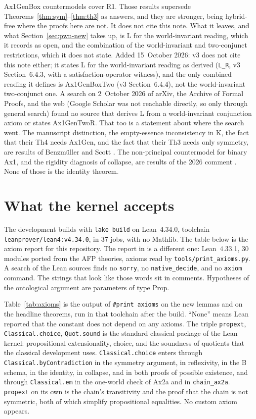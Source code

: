 \documentclass[11pt,a4paper]{article}
\newcommand{\lean}[1]{\texttt{#1}}
\theoremstyle{definition}
\theoremstyle{remark}
\begin{document}
Ax1GenBox countermodels cover R1.
Those results supersede Theorems~\ref{thm:sym}--\ref{thm:th3} as answers,
and they are stronger, being hybrid-free where the proofs here are not.
It does not cite this note.
What it leaves, and what Section~\ref{sec:pwn-new} takes up, is L for the
world-invariant reading, which it records as open, and the combination of
the world-invariant and two-conjunct restrictions, which it does not state.
Added 15~October 2026: v3 does not cite this note either; it states L for the
world-invariant reading as derived (\lean{L\_R}, v3 Section~6.4.3, with a
satisfaction-operator witness), and the only combined reading it defines is
Ax1GenBoxTwo (v3 Section~6.4.4), not the world-invariant two-conjunct
one.
A search on 2~October 2026 of arXiv, the Archive of Formal Proofs, and the
web (Google Scholar was not reachable directly, so only through general
search) found no source that derives L from a world-invariant conjunction
axiom or states Ax1GenTwoR.
That too is a statement about where the search went.
The manuscript distinction, the empty-essence inconsistency in K, the fact
that their Th4 needs Ax1Gen, and the fact that their Th3 needs only symmetry,
are results of Benzm\"uller and Scott \cite{benzmuellerScott2025,afpNotes2025}.
The non-principal countermodel for binary Ax1, and the rigidity diagnosis of
collapse, are results of the 2026 comment \cite{benzmueller2026}.
None of those is the identity theorem.

\section{What the kernel accepts}
\label{sec:kernel}

The development builds with \texttt{lake build} on Lean~4.34.0,
toolchain \texttt{leanprover/lean4:v4.34.0}, in 37 jobs, with no Mathlib.
The table below is the axiom report for this repository.
The report in \cite{benzmuellerLean2026} is a different one: Lean~4.33.1,
30 modules ported from the AFP theories, axioms read by
\lean{tools/print\_axioms.py}.
A search of the Lean sources finds no \lean{sorry}, no \lean{native\_decide},
and no \lean{axiom} command.
The strings that look like those words sit in comments.
Hypotheses of the ontological argument are parameters of type \textsf{Prop}.

Table~\ref{tab:axioms} is the output of \lean{\#print axioms} on the new
lemmas and on the headline theorems, run in that toolchain after the build.
``None'' means Lean reported that the constant does not depend on any axioms.
The triple \lean{propext}, \lean{Classical.choice}, \lean{Quot.sound} is the
standard classical package of the Lean kernel: propositional extensionality,
choice, and the soundness of quotients that the classical development uses.
\lean{Classical.choice} enters through \lean{Classical.byContradiction} in
the symmetry argument, in reflexivity, in the B schema, in the identity, in
collapse, and in both proofs of possible existence, and through
\lean{Classical.em} in the one-world check of Ax2a and in \lean{chain\_ax2a}.
\lean{propext} on its own is the chain's transitivity and the proof that the
chain is not symmetric, both of which simplify propositional equalities.
No custom axiom appears.
\end{document}
